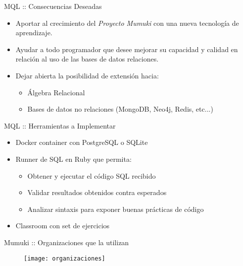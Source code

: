 \documentclass{beamer}
\begin{document}
\begin{frame}{MQL :: Consecuencias Deseadas}

    \begin{itemize}
        \setlength\itemsep{1em}
        \item Aportar al crecimiento del \textit{Proyecto Mumuki} con una nueva tecnología de aprendizaje.
        \item Ayudar a todo programador que desee mejorar su capacidad y calidad en
        relación al uso de las bases de datos relaciones.
        \item Dejar abierta la posibilidad de extensión hacia:
        \vspace{.4em}
        \begin{itemize}
            \setlength\itemsep{.5em}
            \item Álgebra Relacional
            \item Bases de datos no relaciones (MongoDB, Neo4j, Redis, etc...)
        \end{itemize}
    \end{itemize}

\end{frame}


\begin{frame}{MQL :: Herramientas a Implementar}
    \begin{itemize}%
        \setlength\itemsep{1em}
        \item Docker container con PostgreSQL o SQLite
        \item Runner de SQL en Ruby que permita:
        \vspace{.4em}
        \begin{itemize}
            \setlength\itemsep{.5em}
            \item Obtener y ejecutar el código SQL recibido
            \item Validar resultados obtenidos contra esperados
            \item Analizar sintaxis para exponer buenas prácticas de código
        \end{itemize}
        \item Classroom con set de ejercicios
    \end{itemize}
\end{frame}


\begin{frame}{Mumuki :: Organizaciones que la utilizan}
    \begin{figure}[h]
        \texttt{[image: organizaciones]}
    \end{figure}
\end{frame}
\end{document}
